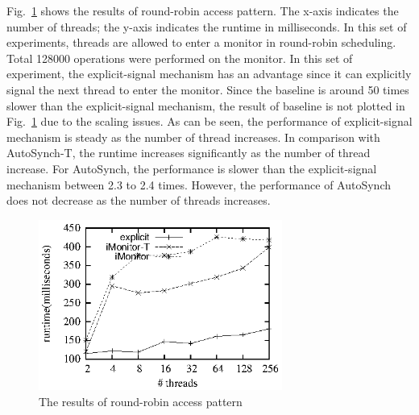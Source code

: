 \documentclass[preprint]{sigplanconf}
\begin{document}
%
Fig.~\ref{fig:rr_eval} shows the results of round-robin access pattern. The
x-axis indicates the number of threads; the y-axis indicates the
runtime in milliseconds. In this set of experiments, threads are allowed to enter a
monitor in round-robin scheduling. Total 128000 operations were performed on 
the monitor. In this set of experiment, the explicit-signal mechanism has an 
advantage since it can explicitly signal the next thread to enter the 
monitor. Since the baseline is around 50 times slower than the explicit-signal
mechanism, the result of baseline is not plotted in Fig.~\ref{fig:rr_eval} due
to the scaling issues. 
As can be seen, the performance of explicit-signal mechanism is steady 
as the number of thread increases. In comparison with AutoSynch-T, the runtime 
increases significantly as the number of thread increase. For AutoSynch, the 
performance is slower than the explicit-signal mechanism between 2.3 to 2.4
times. However, the performance of AutoSynch does not decrease as the number of
threads increases. 

\begin{figure}[ht!]
  \centering
  \includegraphics[width=80mm]{fig/rr.eps}
  \caption{The results of round-robin access pattern}
  \label{fig:rr_eval}
\end{figure}
\end{document}
